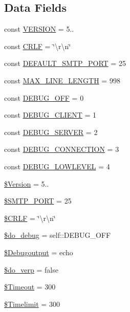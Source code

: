 \subsection*{Data Fields}
\begin{DoxyCompactItemize}
\item 
const \hyperlink{class_s_m_t_p_af71005841ce53adac00581ab0ba24c1f}{V\+E\+R\+S\+I\+ON} = \textquotesingle{}5..\textquotesingle{}
\item 
const \hyperlink{class_s_m_t_p_aa8bdd4d85e1ba0db8c09f92688c27ca6}{C\+R\+LF} = \char`\"{}\textbackslash{}r\textbackslash{}n\char`\"{}
\item 
const \hyperlink{class_s_m_t_p_a71f9f123c4ea8e8f470e46b58a4e527f}{D\+E\+F\+A\+U\+L\+T\+\_\+\+S\+M\+T\+P\+\_\+\+P\+O\+RT} = 25
\item 
const \hyperlink{class_s_m_t_p_a466169b7248c947b2d0d468a955573e7}{M\+A\+X\+\_\+\+L\+I\+N\+E\+\_\+\+L\+E\+N\+G\+TH} = 998
\item 
const \hyperlink{class_s_m_t_p_ad36a2f0b30093f91a7b53bd815a0a143}{D\+E\+B\+U\+G\+\_\+\+O\+FF} = 0
\item 
const \hyperlink{class_s_m_t_p_ae7eea3acb25b5a4367764bcd2f6da5ea}{D\+E\+B\+U\+G\+\_\+\+C\+L\+I\+E\+NT} = 1
\item 
const \hyperlink{class_s_m_t_p_a72dc4712d174a8bfd77415d88a9a2fb3}{D\+E\+B\+U\+G\+\_\+\+S\+E\+R\+V\+ER} = 2
\item 
const \hyperlink{class_s_m_t_p_a9a8bb8dbeb4eb52455545a52bbe35fa6}{D\+E\+B\+U\+G\+\_\+\+C\+O\+N\+N\+E\+C\+T\+I\+ON} = 3
\item 
const \hyperlink{class_s_m_t_p_a9a6a605b541c69171fd68f103e947458}{D\+E\+B\+U\+G\+\_\+\+L\+O\+W\+L\+E\+V\+EL} = 4
\item 
\hyperlink{class_s_m_t_p_a8a43e1c8b245951155d04b279276af95}{\$\+Version} = \textquotesingle{}5..\textquotesingle{}
\item 
\hyperlink{class_s_m_t_p_ae1e172b1b60aa3a8f2385012966200da}{\$\+S\+M\+T\+P\+\_\+\+P\+O\+RT} = 25
\item 
\hyperlink{class_s_m_t_p_a75538b15bafd1ec1eaaa6ea0bbfa642a}{\$\+C\+R\+LF} = \char`\"{}\textbackslash{}r\textbackslash{}n\char`\"{}
\item 
\hyperlink{class_s_m_t_p_a09ca59ee83fba6c8137646a13f1664d1}{\$do\+\_\+debug} = self\+::\+D\+E\+B\+U\+G\+\_\+\+O\+FF
\item 
\hyperlink{class_s_m_t_p_a532f3412f3d97a106a36ff2b49409e42}{\$\+Debugoutput} = \textquotesingle{}echo\textquotesingle{}
\item 
\hyperlink{class_s_m_t_p_abf2ec34ae2e6abd0f598ea202a8fa807}{\$do\+\_\+verp} = false
\item 
\hyperlink{class_s_m_t_p_acaf3ec06f89f4024c5dbeb1a9ecf321c}{\$\+Timeout} = 300
\item 
\hyperlink{class_s_m_t_p_a06202429705cff540be47481b453fef6}{\$\+Timelimit} = 300
\end{DoxyCompactItemize}
